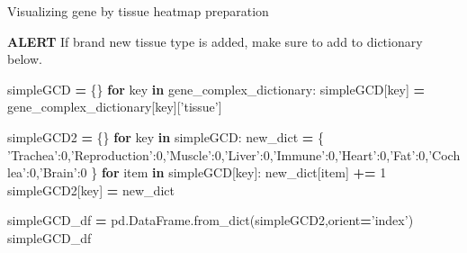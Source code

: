 \documentclass[
]{article}
\newenvironment{Shaded}{\begin{snugshade}}{\end{snugshade}}
\newcommand{\ControlFlowTok}[1]{\textcolor[rgb]{0.13,0.29,0.53}{\textbf{#1}}}
\newcommand{\DecValTok}[1]{\textcolor[rgb]{0.00,0.00,0.81}{#1}}
\newcommand{\KeywordTok}[1]{\textcolor[rgb]{0.13,0.29,0.53}{\textbf{#1}}}
\newcommand{\NormalTok}[1]{#1}
\newcommand{\OperatorTok}[1]{\textcolor[rgb]{0.81,0.36,0.00}{\textbf{#1}}}
\newcommand{\StringTok}[1]{\textcolor[rgb]{0.31,0.60,0.02}{#1}}
\begin{document}
Visualizing gene by tissue heatmap preparation

\textbf{ALERT} If brand new tissue type is added, make sure to add to
dictionary below.

\begin{Shaded}
\begin{Highlighting}[]
\NormalTok{simpleGCD }\OperatorTok{=}\NormalTok{ \{\}}
\ControlFlowTok{for}\NormalTok{ key }\KeywordTok{in}\NormalTok{ gene_complex_dictionary:}
\NormalTok{  simpleGCD[key] }\OperatorTok{=}\NormalTok{ gene_complex_dictionary[key][}\StringTok{'tissue'}\NormalTok{]}

\NormalTok{simpleGCD2 }\OperatorTok{=}\NormalTok{ \{\}}
\ControlFlowTok{for}\NormalTok{ key }\KeywordTok{in}\NormalTok{ simpleGCD:}
\NormalTok{  new_dict }\OperatorTok{=}\NormalTok{ \{}
  \StringTok{'Trachea'}\NormalTok{:}\DecValTok{0}\NormalTok{,}\StringTok{'Reproduction'}\NormalTok{:}\DecValTok{0}\NormalTok{,}\StringTok{'Muscle'}\NormalTok{:}\DecValTok{0}\NormalTok{,}\StringTok{'Liver'}\NormalTok{:}\DecValTok{0}\NormalTok{,}\StringTok{'Immune'}\NormalTok{:}\DecValTok{0}\NormalTok{,}\StringTok{'Heart'}\NormalTok{:}\DecValTok{0}\NormalTok{,}\StringTok{'Fat'}\NormalTok{:}\DecValTok{0}\NormalTok{,}\StringTok{'Cochlea'}\NormalTok{:}\DecValTok{0}\NormalTok{,}\StringTok{'Brain'}\NormalTok{:}\DecValTok{0}
\NormalTok{  \}}
  \ControlFlowTok{for}\NormalTok{ item }\KeywordTok{in}\NormalTok{ simpleGCD[key]:}
\NormalTok{    new_dict[item] }\OperatorTok{+=} \DecValTok{1}
\NormalTok{  simpleGCD2[key] }\OperatorTok{=}\NormalTok{ new_dict}

\NormalTok{simpleGCD_df }\OperatorTok{=}\NormalTok{ pd.DataFrame.from_dict(simpleGCD2,orient}\OperatorTok{=}\StringTok{'index'}\NormalTok{)}
\NormalTok{simpleGCD_df}
\end{Highlighting}
\end{Shaded}
\end{document}
